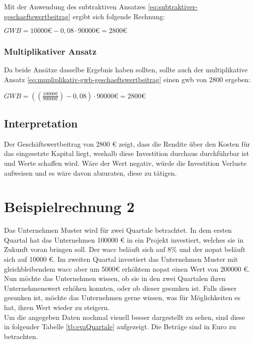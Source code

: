 Mit der Anwendung des subtraktiven Ansatzes \eqref{eq:subtraktiver-geschaeftswertbeitrag} ergibt sich folgende Rechnung:

\bigskip
$GWB = 10000 \text{€} - 0,08 \cdot 90000 \text{€} = 2800 \text{€}$


\subsubsection{Multiplikativer Ansatz}

Da beide Ansätze dasselbe Ergebnis haben sollten, sollte auch der multiplikative Ansatz \eqref{eq:mupliplikativ-gwb-geschaeftswertbeitrag} einen \ac{gwb} von 2800 ergeben:

\bigskip
$GWB = ((\frac{10000 \text{€}}{90000 \text{€}}) - 0,08) \cdot 90000 \text{€} = 2800 \text{€}$

\subsection{Interpretation}

Der Geschäftswertbeitrag von 2800 € zeigt, dass die Rendite über den Kosten für das eingesetzte Kapital liegt, weshalb diese Investition durchaus durchführbar ist und Werte schaffen wird. Wäre der Wert negativ, würde die Investition Verluste aufweisen und es wäre davon abzuraten, diese zu tätigen.

\section{Beispielrechnung 2}

Das Unternehmen Muster wird für zwei Quartale betrachtet. In dem ersten Quartal hat das Unternehmen 100000 € in ein Projekt investiert, welches sie in Zukunft voran bringen soll. Der \ac{wacc} beläuft sich auf 8\% und der \ac{nopat} beläuft sich auf 10000 €. Im zweiten Quartal investiert das Unternehmen Muster mit gleichbleibendem \ac{wacc} aber um 5000€ erhöhtem \ac{nopat} einen Wert von 200000 €. Nun möchte das Unternehmen wissen, ob sie in den zwei Quartalen ihren Unternehmenswert erhöhen konnten, oder ob dieser gesunken ist. Falls dieser gesunken ist, möchte das Unternehmen gerne wissen, was für Möglichkeiten es hat, ihren Wert wieder zu steigern.\\
Um die angegeben Daten nochmal visuell besser dargestellt zu sehen, sind diese in folgender Tabelle \eqref{tb:evaQuartale} aufgezeigt. Die Beträge sind in Euro zu betrachten.

